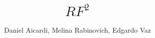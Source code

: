 
\title{$RF^{2}$}

\author{Daniel Aicardi, Melina Rabinovich, Edgardo Vaz}



\degree{}


\maketitle










